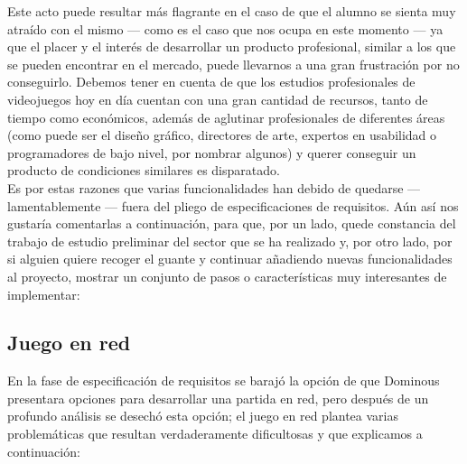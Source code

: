 Este acto puede resultar más flagrante en el caso de que el alumno se sienta muy atraído con el mismo --- como es el caso
que nos ocupa en este momento --- ya que el placer y el interés de desarrollar un producto profesional, similar a los que
se pueden encontrar en el mercado, puede llevarnos a una gran frustración por no conseguirlo. Debemos tener en cuenta de que
los estudios profesionales de videojuegos hoy en día cuentan con una gran cantidad de recursos, tanto de tiempo como
económicos, además de aglutinar profesionales de diferentes áreas (como puede ser el diseño gráfico, directores de arte,
expertos en usabilidad o programadores de bajo nivel, por nombrar algunos) y querer conseguir un producto de condiciones
similares es disparatado. \\

Es por estas razones que varias funcionalidades han debido de quedarse --- lamentablemente --- fuera del pliego de
especificaciones de requisitos. Aún así nos gustaría comentarlas a continuación, para que, por un lado, quede constancia
del trabajo de estudio preliminar del sector que se ha realizado y, por otro lado, por si alguien quiere recoger
el guante y continuar añadiendo nuevas funcionalidades al proyecto, mostrar un conjunto de pasos o características
muy interesantes de implementar:

\subsection{Juego en red}

En la fase de especificación de requisitos se barajó la opción de que Dominous presentara opciones para desarrollar una
partida en red, pero después de un profundo análisis se desechó esta opción; el juego en red plantea varias problemáticas
que resultan verdaderamente dificultosas y que explicamos a continuación:

